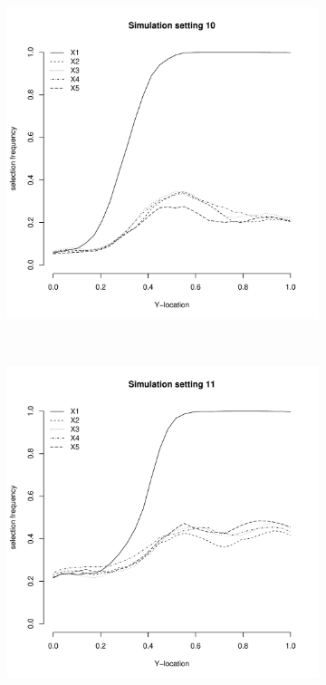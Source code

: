 \documentclass[authoryear, review, 11pt]{elsarticle}
\begin{document}
	\begin{figure}
		\centering
		\begin{subfigure}[b]{0.3\textwidth}
			\centering
			\includegraphics[width=\textwidth]{../../figures/simulation/28-10-profile-selection.pdf}
			\label{fig:gull}
		\end{subfigure}%
        ~ %
		\begin{subfigure}[b]{0.3\textwidth}
			\centering
			\includegraphics[width=\textwidth]{../../figures/simulation/28-11-profile-selection.pdf}

\end{subfigure}
\end{figure}
\end{document}
